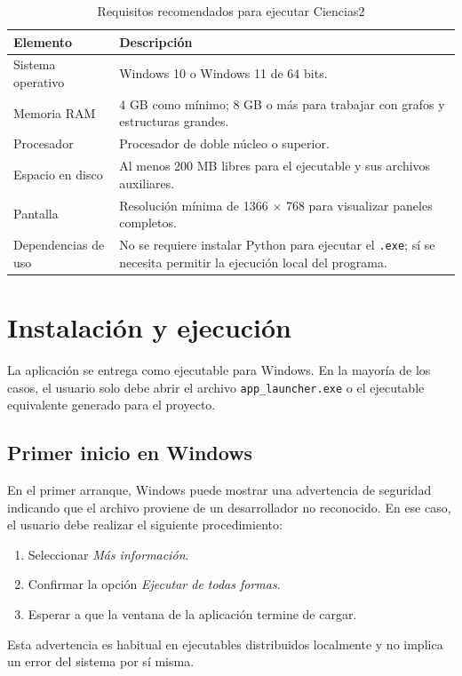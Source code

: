 \documentclass[10pt,onecolumn]{IEEEtran}
\begin{document}
\begin{table}[H]
\centering
\caption{Requisitos recomendados para ejecutar Ciencias2}
\label{tab:requisitos}
\begin{tabularx}{0.95\linewidth}{>{\raggedright\arraybackslash}p{3.9cm}X}
\toprule
\textbf{Elemento} & \textbf{Descripción} \\
\midrule
Sistema operativo & Windows 10 o Windows 11 de 64 bits. \\
Memoria RAM & 4 GB como mínimo; 8 GB o más para trabajar con grafos y estructuras grandes. \\
Procesador & Procesador de doble núcleo o superior. \\
Espacio en disco & Al menos 200 MB libres para el ejecutable y sus archivos auxiliares. \\
Pantalla & Resolución mínima de 1366 \(\times\) 768 para visualizar paneles completos. \\
Dependencias de uso & No se requiere instalar Python para ejecutar el \texttt{.exe}; sí se necesita permitir la ejecución local del programa. \\
\bottomrule
\end{tabularx}
\end{table}

\section{Instalación y ejecución}
La aplicación se entrega como ejecutable para Windows. En la mayoría de los casos, el usuario solo debe abrir el archivo \texttt{app\_launcher.exe} o el ejecutable equivalente generado para el proyecto.

\subsection{Primer inicio en Windows}
En el primer arranque, Windows puede mostrar una advertencia de seguridad indicando que el archivo proviene de un desarrollador no reconocido. En ese caso, el usuario debe realizar el siguiente procedimiento:
\begin{enumerate}
  \item Seleccionar \textit{Más información}.
  \item Confirmar la opción \textit{Ejecutar de todas formas}.
  \item Esperar a que la ventana de la aplicación termine de cargar.
\end{enumerate}

Esta advertencia es habitual en ejecutables distribuidos localmente y no implica un error del sistema por sí misma.
\end{document}
